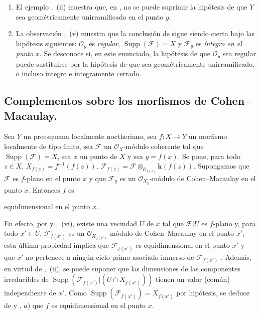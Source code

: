 \begin{remarks}[15.3.4]
\label{IV.15.3.4}
\begin{enumerate}[label=(\roman*)]
  \item El ejemplo ,~(ii) muestra que, en , no se puede suprimir la hipótesis de que $Y$ sea geométricamente unirramificado en el punto $y$.
  \item La observación ,~(v) muestra que la conclusión de  sigue siendo cierta bajo las hipótesis siguientes: $\mathcal O_y$ es \emph{regular}, $\operatorname{Supp}(\mathcal F)=X$ y $\mathcal F_y$ es \emph{íntegro en el punto} $x$.
Se desconoce si, en este enunciado, la hipótesis de que $\mathcal O_y$ sea regular puede sustituirse por la hipótesis de que sea geométricamente unirramificado, o incluso íntegro e íntegramente cerrado.
\end{enumerate}
\end{remarks}

\subsection{Complementos sobre los morfismos de Cohen--Macaulay.}
\label{subsection:IV.15.4}

\begin{proposition}[15.4.1]
\label{IV.15.4.1}
Sea $Y$ un preesquema localmente noetheriano, sea $f:X\to Y$ un morfismo localmente de tipo finito, sea $\mathcal F$ un $\mathcal O_X$-módulo coherente tal que $\operatorname{Supp}(\mathcal F)=X$, sea $x$ un punto de $X$ y sea $y=f(x)$.
Se pone, para todo $z\in X$, $X_{f(z)}=f^{-1}(f(z))$, $\mathcal F_{f(z)}=\mathcal F\otimes_{\mathcal O_{f(z)}}\boldsymbol{k}(f(z))$.
Supongamos que $\mathcal F$ es $f$-plano en el punto $x$ y que $\mathcal F_y$ es un $\mathcal O_{X_y}$-módulo de Cohen--Macaulay en el punto $x$.
Entonces $f$ es

equidimensional en el punto $x$.

\end{proposition}

En efecto, por  y ,~(vi), existe una vecindad $U$ de $x$ tal que $\mathcal F|U$ es $f$-plano y, para todo $x'\in U$, $\mathcal F_{f(x')}$ es un $\mathcal O_{X_{f(x')}}$-módulo de Cohen--Macaulay en el punto $x'$; esta última propiedad implica que $\mathcal F_{f(x')}$ es equidimensional en el punto $x'$ y que $x'$ no pertenece a ningún ciclo primo asociado inmerso de $\mathcal F_{f(x')}$ .
Además, en virtud de ,~(ii), se puede suponer que las dimensiones de las componentes irreducibles de $\operatorname{Supp}(\mathcal F_{f(x')}|(U\cap X_{f(x')}))$ tienen un valor (común) independiente de $x'$.
Como $\operatorname{Supp}(\mathcal F_{f(x')})=X_{f(x')}$ por hipótesis, se deduce de  y , $a$) que $f$ es equidimensional en el punto $x$.


